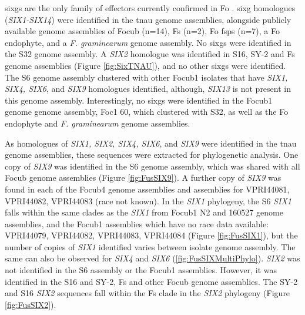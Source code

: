 \Acp{sixg} are the only family of effectors currently confirmed in \ac{Fo} \parencite{Armitage2018, Czislowski2018}. \Ac{sixg} homologues (\textit{SIX1-SIX14}) were identified in the \ac{tnau} genome assemblies, alongside publicly available genome assemblies of \ac{Focub} (n=14), \ac{Fs} (n=2), \ac{Fo} \acp{fsp} (n=7), a \ac{Fo} endophyte, and a \textit{F. graminearum} genome assembly. No \acp{sixg} were identified in the S32 genome assembly. A \textit{SIX2} homologue was identified in S16,  SY-2  and  \ac{Fs} genome assemblies (Figure \ref{fig:SixTNAU}), and no other \acp{sixg} were identified. The S6 genome assembly clustered with other \ac{Focub1} isolates that have \textit{SIX1, SIX4, SIX6}, and \textit{SIX9} homologues identified, although, \textit{SIX13} is not present in this genome assembly. Interestingly, no \acp{sixg} were identified in the \ac{Focub1} genome genome assembly, Foc1 60, which clustered with S32, as well as the \ac{Fo} endophyte and \textit{F. graminearum} genome assemblies. 

As homologues of \textit{SIX1, SIX2, SIX4, SIX6}, and \textit{SIX9} were identified in the \ac{tnau} genome assemblies, these sequences were extracted for phylogenetic analysis.  One copy of \textit{SIX9} was identified in the S6 genome assembly, which was shared with all \ac{Focub} genome assemblies (Figure \ref{fig:FusSIX9}). A further copy of \textit{SIX9} was found in each of the \ac{Focub4} genome assemblies and assemblies for VPRI44081, VPRI44082, VPRI44083 (race not known). In the \textit{SIX1} phylogeny, the S6 \textit{SIX1}  falls within the same clades as the \textit{SIX1} from \ac{Focub1} N2 and 160527 genome assemblies, and the \ac{Focub1} assemblies which have no race data available: VPRI44079, VPRI44082, VPRI44083, VPRI44084 (Figure \ref{fig:FusSIX1}), but the number of copies of \textit{SIX1} identified varies between isolate genome assembly. The same can also be observed for \textit{SIX4} and \textit{SIX6} (\ref{fig:FusSIXMultiPhylo}). \textit{SIX2} was not identified in the S6 assembly or the \ac{Focub1} assemblies. However, it was identified in the S16 and SY-2, \ac{Fs} and other \ac{Focub} genome assemblies. The SY-2 and S16 \textit{SIX2} sequences fall within the \ac{Fs} clade in the \textit{SIX2} phylogeny (Figure \ref{fig:FusSIX2}).

